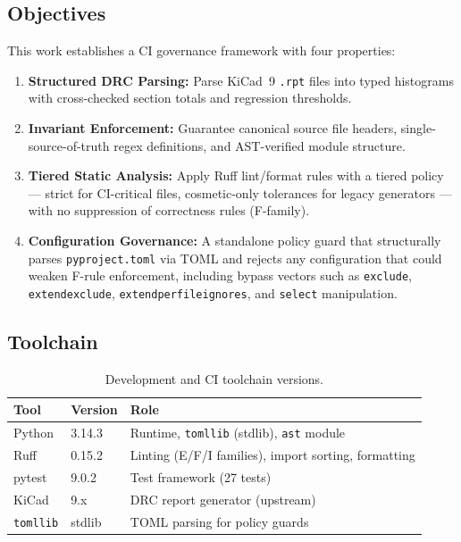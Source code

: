 \documentclass[11pt,a4paper]{article}
\begin{document}
\subsection{Objectives}

This work establishes a CI governance framework with four properties:

\begin{enumerate}[label=\textbf{P\arabic*}]
    \item \textbf{Structured DRC Parsing:} Parse KiCad~9 \texttt{.rpt} files into
          typed histograms with cross-checked section totals and regression thresholds.
    \item \textbf{Invariant Enforcement:} Guarantee canonical source file headers,
          single-source-of-truth regex definitions, and AST-verified module structure.
    \item \textbf{Tiered Static Analysis:} Apply Ruff lint/format rules with a
          tiered policy --- strict for CI-critical files, cosmetic-only tolerances
          for legacy generators --- with no suppression of correctness rules (F-family).
    \item \textbf{Configuration Governance:} A standalone policy guard that
          structurally parses \texttt{pyproject.toml} via TOML and rejects any
          configuration that could weaken F-rule enforcement, including bypass
          vectors such as \texttt{exclude}, \texttt{extend\-exclude},
          \texttt{extend\-per\-file\-ignores}, and \texttt{select} manipulation.
\end{enumerate}

\subsection{Toolchain}

\begin{table}[H]
\centering
\caption{Development and CI toolchain versions.}
\label{tab:toolchain}
\begin{tabular}{@{}lll@{}}
\toprule
\textbf{Tool} & \textbf{Version} & \textbf{Role} \\
\midrule
Python       & 3.14.3  & Runtime, \texttt{tomllib} (stdlib), \texttt{ast} module \\
Ruff         & 0.15.2  & Linting (E/F/I families), import sorting, formatting \\
pytest       & 9.0.2   & Test framework (27 tests) \\
KiCad        & 9.x     & DRC report generator (upstream) \\
\texttt{tomllib} & stdlib & TOML parsing for policy guards \\
\bottomrule
\end{tabular}
\end{table}
\end{document}
